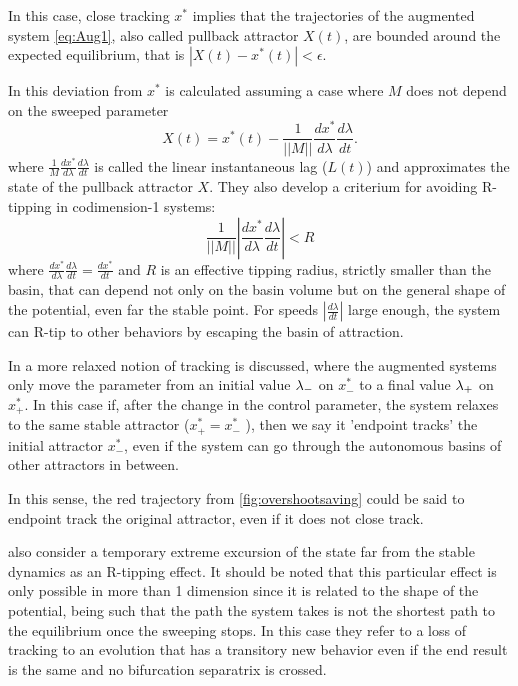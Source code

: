 In this case, close tracking $x^*$ implies that the trajectories of the augmented system \cref{eq:Aug1}, also called pullback attractor $X(t)$,  are bounded around the expected equilibrium, that is $|X(t)-x^*(t)|<\epsilon$. 

In \cite{Ashwin2012} this deviation from $x^*$ is calculated assuming  a case where $M$ does not depend on the sweeped parameter
\begin{equation}
	X(t)=x^*(t)-\frac{1}{||M||}\frac{d x^*}{d\lambda}\frac{d\lambda}{d t }.
	\label{eq:r_equilibrium}
\end{equation}
where $\frac{1}{M}\frac{d x^*}{d\lambda}\frac{d\lambda}{d t }$ is  called the linear instantaneous lag ($L(t)$) and approximates the state of the pullback attractor $X$. 
They also develop a criterium for avoiding R-tipping in codimension-1 systems:
\begin{equation}
	\frac{1}{||M||} \left| \frac{d x^*}{d\lambda}\frac{d\lambda}{d t } \right| <R
\label{eq:Ashwin_track}
\end{equation}
where $\frac{d x^*}{d\lambda}\frac{d\lambda}{d t }=\frac{d x^*}{d t}$ and $R$ is an effective tipping radius, strictly smaller than the basin, that can depend not only on the basin volume but on the general shape of the potential, even far the stable point. 
For speeds $|\frac{d\lambda}{d t }|$ large enough, the system can R-tip to other behaviors by escaping the basin of attraction. 

In \cite{Kees2017a,Kiers2020a} a more relaxed notion of tracking is discussed, where the augmented systems only move the parameter from an initial value $\lambda_-$ on $x_-^*$ to a final value $\lambda_+$ on $x_+^*$. In this case if, after the change in the control parameter, the system relaxes to the same stable attractor ($x_+^*=x_-^*$ ), then we say it 'endpoint tracks' the initial attractor $x^*_-$, even if the system can  go through the autonomous basins of other attractors in  between. 

In this sense, the red trajectory from \ref{fig:overshootsaving} could be said to endpoint track the original attractor, even if it does not close track. 

\cite{Pierini2021,Vanselow2019} also consider a temporary extreme excursion of the state far from the stable dynamics as an R-tipping effect.
It should be noted that this particular effect is only possible in more than 1 dimension since it is related to the shape of the potential,  being such that the path the system takes is not the shortest path to the equilibrium once the sweeping stops. 
In this case they refer to a loss of tracking to an evolution that has a transitory new behavior even if the end result is the same and no bifurcation separatrix is crossed.


